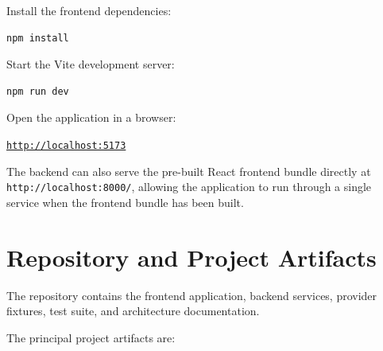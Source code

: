 \documentclass[11pt,a4paper]{article}
\begin{document}
Install the frontend dependencies:

\begin{lstlisting}[language=bash]
npm install
\end{lstlisting}

Start the Vite development server:

\begin{lstlisting}[language=bash]
npm run dev
\end{lstlisting}

Open the application in a browser:

\begin{center}
\href{http://localhost:5173}{\texttt{http://localhost:5173}}
\end{center}

\begin{successbox}[title={Alternative Execution}]
The backend can also serve the pre-built React frontend bundle
directly at \texttt{http://localhost:8000/}, allowing the
application to run through a single service when the frontend
bundle has been built.
\end{successbox}


\section{Repository and Project Artifacts}

The repository contains the frontend application, backend
services, provider fixtures, test suite, and architecture
documentation.

The principal project artifacts are:
\end{document}
